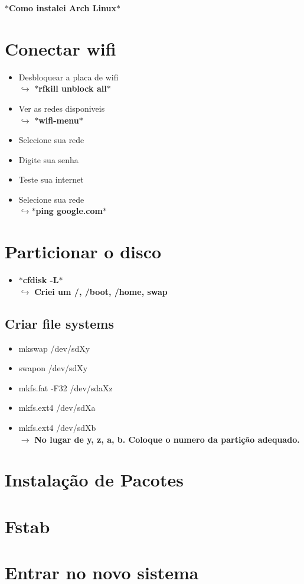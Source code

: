\documentclass[12pt, a4paper] {article}
\begin{document}
	\begin{center}
		\Large\textbf{$\ast$Como instalei Arch Linux$\ast$}
	\end{center}
	
	\section{Conectar wifi}
	\begin{itemize}
		\item Desbloquear a placa de wifi\\
		\indent\indent$\hookrightarrow$ \textbf{$\ast$rfkill unblock all$\ast$}
		\item Ver as redes disponiveis\\
	 	\indent\indent$\hookrightarrow$ \textbf{$\ast$wifi-menu$\ast$}
		\item Selecione sua rede	
		\item Digite sua senha
		\item Teste sua internet
		\item Selecione sua rede\\
	 	\indent\indent$\hookrightarrow$\textbf{$\ast$ping google.com$\ast$}
	\end{itemize}
	\section{Particionar o disco}
	\begin{itemize}
		\item \textbf{$\ast$cfdisk -L$\ast$}\\
		$\hookrightarrow$ \textbf{Criei um /, /boot, /home, swap}
	\end{itemize}
	\subsection{Criar file systems}
	\begin{itemize}
		\item mkswap /dev/sdXy
		\item swapon /dev/sdXy
		\item mkfs.fat -F32 /dev/sdaXz
		\item mkfs.ext4 /dev/sdXa
		\item mkfs.ext4 /dev/sdXb\\
		$\rightarrow$ \textbf{No lugar de y, z, a, b. Coloque o numero da partição adequado.}
	\end{itemize}
	
	\section{Instalação de Pacotes}

	\section{Fstab}

	\section{Entrar no novo sistema}
\end{document}
